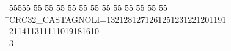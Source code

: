%
%
\begin{tabbing}
55555 \= 55 \= 55 \= 55 \= 55 \= 55 \= 55 \= 55 \= 55 \= 55 \= 55 \= 55 \= 55 \= \>CRC32\_CASTAGNOLI=1321281271261251231221201191\\[0pt]
211411311111019181610\\[0pt]
3\>\end{tabbing}

